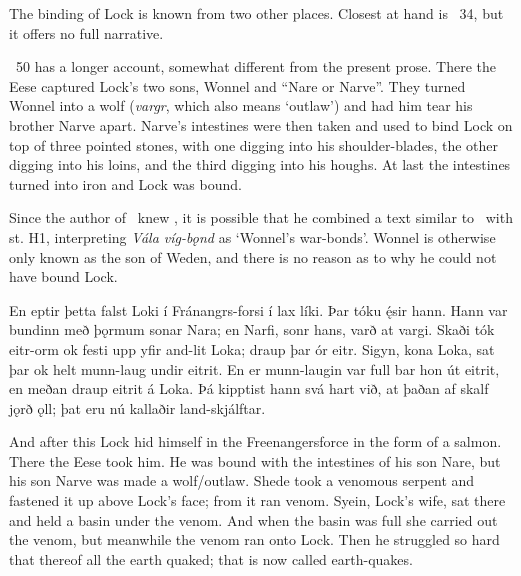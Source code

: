 The binding of Lock is known from two other places. Closest at hand is \Voluspa\ 34, but it offers no full narrative.

\Gylfaginning\ 50 has a longer account, somewhat different from the present prose. There the Eese captured Lock’s two sons, Wonnel and “Nare or Narve”. They turned Wonnel into a wolf (\emph{vargr}, which also means ‘outlaw’) and had him tear his brother Narve apart. Narve’s intestines were then taken and used to bind Lock on top of three pointed stones, with one digging into his shoulder-blades, the other digging into his loins, and the third digging into his houghs. At last the intestines turned into iron and Lock was bound.

Since the author of \Gylfaginning\ knew \Voluspa, it is possible that he combined a text similar to \FraLoka\ with st. H1, interpreting \emph{Vála víg-bǫnd} as ‘Wonnel’s war-bonds’. Wonnel is otherwise only known as the son of Weden, and there is no reason as to why he could not have bound Lock.

\sectionline

\bpg\bpa En eptir þetta falst Loki í Fránangrs-forsi í lax líki. Þar tóku ę́sir hann. Hann var bundinn með þǫrmum sonar Nara; en Narfi, sonr hans, varð at vargi. Skaði tók eitr-orm ok festi upp yfir and-lit Loka; draup þar ór eitr. Sigyn, kona Loka, sat þar ok helt munn-laug undir eitrit. En er munn-laugin var full bar hon út eitrit, en meðan draup eitrit á Loka. Þá kipptist hann svá hart við, at þaðan af skalf jǫrð ǫll; þat eru nú kallaðir land-skjálftar.\epa

\bpb And after this Lock hid himself in the Freenangersforce in the form of a salmon. There the Eese took him. He was bound with the intestines of his son Nare, but his son Narve was made a wolf/outlaw. Shede took a venomous serpent and fastened it up above Lock’s face; from it ran venom. Syein, Lock’s wife, sat there and held a basin under the venom. And when the basin was full she carried out the venom, but meanwhile the venom ran onto Lock. Then he struggled so hard that thereof all the earth quaked; that is now called earth-quakes.\epb\epg

\sectionline
